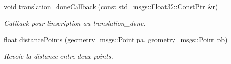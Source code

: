 \begin{DoxyCompactItemize}
void \hyperlink{classdecision_ab874f222aac437a05fe8bc8c5d8963b4}{translation\+\_\+done\+Callback} (const std\+\_\+msgs\+::\+Float32\+::\+Const\+Ptr \&r)
\begin{DoxyCompactList}\small\item\em Callback pour l\textquotesingle{}inscription au translation\+\_\+done. \end{DoxyCompactList}\item 
float \hyperlink{classdecision_a1b6988efc70e0a25ddb7be0f372d2ad2}{distance\+Points} (geometry\+\_\+msgs\+::\+Point pa, geometry\+\_\+msgs\+::\+Point pb)
\begin{DoxyCompactList}\small\item\em Revoie la distance entre deux points. \end{DoxyCompactList}\end{DoxyCompactItemize}
